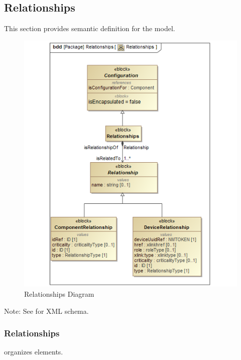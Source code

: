 \subsection{Relationships} \label{sec:Relationships}


This section provides semantic definition for the  model.

\begin{figure}[ht]
  \centering
    \includegraphics[width=1.0\textwidth]{figures/Relationships.png}
  \caption{Relationships Diagram}
  \label{fig:Relationships Diagram}
\end{figure}

\FloatBarrier


Note: See  for XML schema.


\subsubsection{Relationships}




 \glspl{organize}  elements.


